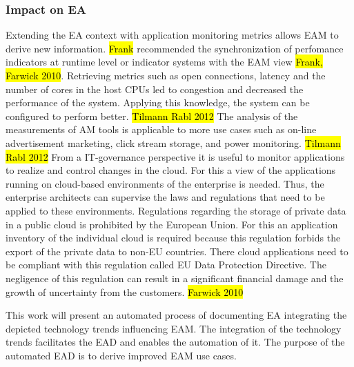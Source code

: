 \subsubsection{Impact on EA}
Extending the EA context with application monitoring metrics allows EAM to derive new information. \hl{Frank} recommended the synchronization of perfomance indicators at runtime level or indicator systems with the EAM view \hl{Frank, Farwick 2010}. Retrieving metrics such as open connections, latency and the number of cores in the host CPUs led to congestion and decreased the performance of the system. Applying this knowledge, the system can be configured to perform better. \hl{Tilmann Rabl 2012} The analysis of the measurements of AM tools is applicable to more use cases such as  on-line advertisement marketing, click stream storage, and power monitoring. \hl{Tilmann Rabl 2012}
From a IT-governance perspective it is useful to monitor applications to realize and control changes in the cloud. For this a view of the applications running on cloud-based environments of the enterprise is needed. Thus, the enterprise architects can supervise the laws and regulations that need to be applied to these environments. 
Regulations regarding the storage of private data in a public cloud is prohibited by the European Union. For this an application inventory of the individual cloud is required because this regulation forbids the export of the private data to non-EU countries. There cloud applications need to be compliant with this regulation called EU Data Protection Directive. The negligence of this regulation can result in a significant financial damage and the growth of uncertainty from the customers. \hl{Farwick 2010}



This work will present an automated process of documenting EA integrating the depicted technology trends influencing EAM. The integration of the technology trends facilitates the EAD and enables the automation of it. The purpose of the automated EAD is to derive improved EAM use cases.

